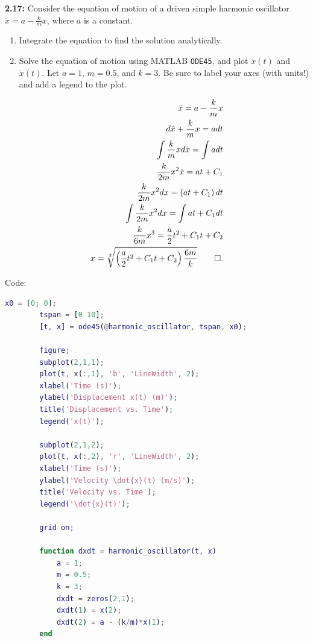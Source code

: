 \begin{homeworkProblem}

	\textbf{2.17:} Consider the equation of motion of a driven simple harmonic oscillator \( \ddot{x} = a - \frac{k}{m} x \), where \( a \) is a constant.
	\begin{enumerate}
		\item Integrate the equation to find the solution analytically.
		\item Solve the equation of motion using \textsc{MATLAB} \lstinline{ODE45}, and plot \( x(t) \) and \( \dot{x}(t) \). Let \( a = 1 \), \( m = 0.5 \), and \( k = 3 \). Be sure to label your axes (with units!) and add a legend to the plot.
	\end{enumerate}

	\solution

	\begin{align*}
		\ddot{x} = a - \frac{k}{m}x                           \\
		d\dot{x} + \frac{k}{m}x = a dt                        \\
		\int \frac{k}{m}x d\dot{x} = \int a dt                \\
		\frac{k}{2m}x^{2} \dot{x} = at + C_{1}                \\
		\frac{k}{2m}x^{2} dx = \left( at + C_{1} \right) dt   \\
		\int \frac{k}{2m}x^{2} dx = \int at + C_{1} dt        \\
		\frac{k}{6m}x^{3} = \frac{a}{2}t^{2} + C_{1}t + C_{2} \\
		x = \sqrt[3]{\left( \frac{a}{2}t^{2} + C_{1}t + C_{2} \right) \frac{6m}{k}} \qed
		.\end{align*}

	Code:
	\begin{lstlisting}[language=MATLAB]
		x0 = [0; 0];
		tspan = [0 10];
		[t, x] = ode45(@harmonic_oscillator, tspan, x0);

		figure;
		subplot(2,1,1);
		plot(t, x(:,1), 'b', 'LineWidth', 2);
		xlabel('Time (s)');
		ylabel('Displacement x(t) (m)');
		title('Displacement vs. Time');
		legend('x(t)');

		subplot(2,1,2);
		plot(t, x(:,2), 'r', 'LineWidth', 2);
		xlabel('Time (s)');
		ylabel('Velocity \dot{x}(t) (m/s)');
		title('Velocity vs. Time');
		legend('\dot{x}(t)');

		grid on;

		function dxdt = harmonic_oscillator(t, x)
		    a = 1;
		    m = 0.5;
		    k = 3;
		    dxdt = zeros(2,1);
		    dxdt(1) = x(2);
		    dxdt(2) = a - (k/m)*x(1);
		end
	\end{lstlisting}


\end{homeworkProblem}
